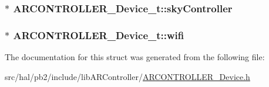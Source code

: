 \subsubsection[{\texorpdfstring{sky\+Controller}{skyController}}]{$\ast$ A\+R\+C\+O\+N\+T\+R\+O\+L\+L\+E\+R\+\_\+\+Device\+\_\+t\+::sky\+Controller}\hypertarget{struct_a_r_c_o_n_t_r_o_l_l_e_r___device__t_a47ff323cbab9d95bbcdb1ecbc3bc2fb4}{}\label{struct_a_r_c_o_n_t_r_o_l_l_e_r___device__t_a47ff323cbab9d95bbcdb1ecbc3bc2fb4}
\subsubsection[{\texorpdfstring{wifi}{wifi}}]{$\ast$ A\+R\+C\+O\+N\+T\+R\+O\+L\+L\+E\+R\+\_\+\+Device\+\_\+t\+::wifi}\hypertarget{struct_a_r_c_o_n_t_r_o_l_l_e_r___device__t_ac67bc8885a15843e6fd67c3f04913325}{}\label{struct_a_r_c_o_n_t_r_o_l_l_e_r___device__t_ac67bc8885a15843e6fd67c3f04913325}


The documentation for this struct was generated from the following file\+:\begin{DoxyCompactItemize}
\item 
src/hal/pb2/include/lib\+A\+R\+Controller/\hyperlink{_a_r_c_o_n_t_r_o_l_l_e_r___device_8h}{A\+R\+C\+O\+N\+T\+R\+O\+L\+L\+E\+R\+\_\+\+Device.\+h}\end{DoxyCompactItemize}
